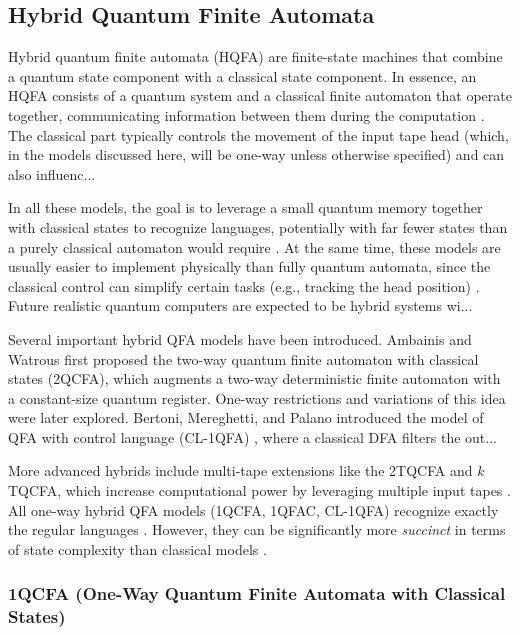 \subsection{Hybrid Quantum Finite Automata}
\label{sec:hybrid-qfa}

Hybrid quantum finite automata (HQFA) are finite-state machines that combine a quantum state component with a classical state component. In essence, an HQFA consists of a quantum system and a classical finite automaton that operate together, communicating information between them during the computation \cite{li2015hybrid}. The classical part typically controls the movement of the input tape head (which, in the models discussed here, will be one-way unless otherwise specified) and can also influenc...

In all these models, the goal is to leverage a small quantum memory together with classical states to recognize languages, potentially with far fewer states than a purely classical automaton would require \cite{zheng2012one}. At the same time, these models are usually easier to implement physically than fully quantum automata, since the classical control can simplify certain tasks (e.g., tracking the head position) \cite{qiu2009one}. Future realistic quantum computers are expected to be hybrid systems wi...

Several important hybrid QFA models have been introduced. Ambainis and Watrous \cite{ambainis2002two} first proposed the two-way quantum finite automaton with classical states (2QCFA), which augments a two-way deterministic finite automaton with a constant-size quantum register. One-way restrictions and variations of this idea were later explored. Bertoni, Mereghetti, and Palano introduced the model of QFA with control language (CL-1QFA) \cite{mereghetti2006quantum}, where a classical DFA filters the out...

More advanced hybrids include multi-tape extensions like the 2TQCFA and $k$TQCFA, which increase computational power by leveraging multiple input tapes \cite{zheng2011two}. All one-way hybrid QFA models (1QCFA, 1QFAC, CL-1QFA) recognize exactly the regular languages \cite{li2015hybrid, zheng2012one}. However, they can be significantly more \textit{succinct} in terms of state complexity than classical models \cite{xiao2021state}.

\subsubsection{1QCFA (One-Way Quantum Finite Automata with Classical States)}

